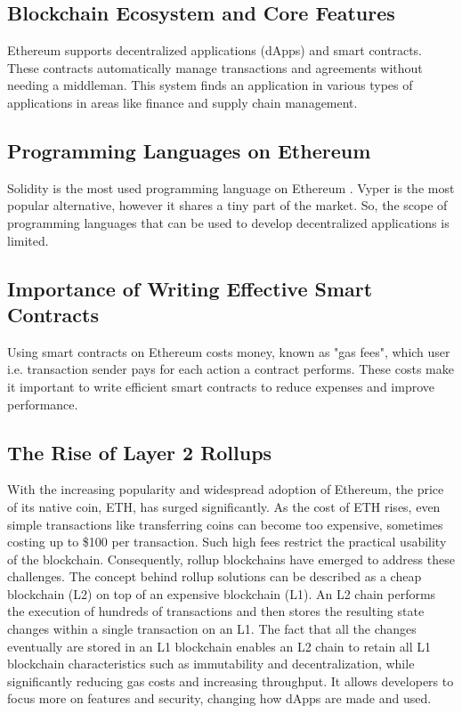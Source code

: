 \subsection{Blockchain Ecosystem and Core Features}
Ethereum supports decentralized applications (dApps) and smart contracts. These contracts automatically manage transactions and agreements without needing a middleman. This system finds an application in various types of applications in areas like finance and supply chain management.

\subsection{Programming Languages on Ethereum}

Solidity is the most used programming language on Ethereum \cite{SolidityWidelyUsed}. Vyper is the most popular alternative, however it shares a tiny part of the market. So, the scope of programming languages that can be used to develop decentralized applications is limited.

\subsection{Importance of Writing Effective Smart Contracts}
Using smart contracts on Ethereum costs money, known as "gas fees", which user i.e. transaction sender pays for each action a contract performs. These costs make it important to write efficient smart contracts to reduce expenses and improve performance.

\subsection{The Rise of Layer 2 Rollups}
With the increasing popularity and widespread adoption of Ethereum, the price of its native coin, ETH, has surged significantly. As the cost of ETH rises, even simple transactions like transferring coins can become too expensive, sometimes costing up to \$100 per transaction. Such high fees restrict the practical usability of the blockchain. Consequently, rollup blockchains have emerged to address these challenges. The concept behind rollup solutions can be described as a cheap blockchain (L2) on top of an expensive blockchain (L1). An L2 chain performs the execution of hundreds of transactions and then stores the resulting state changes within a single transaction on an L1. The fact that all the changes eventually are stored in an L1 blockchain enables an L2 chain to retain all L1 blockchain characteristics such as immutability and decentralization, while significantly reducing gas costs and increasing throughput. It allows developers to focus more on features and security, changing how dApps are made and used.


